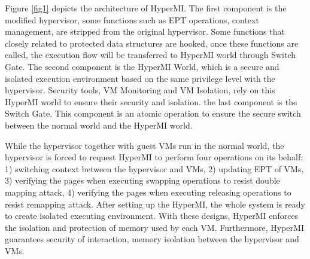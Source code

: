 \documentclass[conference]{IEEEtran}
\begin{document}
Figure \ref{fig1} depicts the architecture of HyperMI. The first component is the modified hypervisor, some functions such as EPT operations, context management, are stripped from the original hypervisor. Some functions that closely related to protected data structures are hooked, once these functions are called, the execution flow will be transferred to HyperMI world through Switch Gate. The second component is the HyperMI World, which is a secure and isolated execution environment based on the same privilege level with the hypervisor. Security tools, VM Monitoring and VM Isolation, rely on this HyperMI world to ensure their security and isolation. the last component is the Switch Gate. This component is an atomic operation to ensure the secure switch between the normal world and the HyperMI world. 




While the hypervisor together with guest VMs run in the normal world, the hypervisor is forced to request HyperMI to perform four operations on its behalf: 1) switching context between the hypervisor and VMs, 2) updating EPT of VMs, 3) verifying the pages when executing swapping operations to resist double mapping attack, 4) verifying the pages when executing releasing operations to resist remapping attack. After setting up the HyperMI, the whole system is ready to create isolated executing environment. With these designs, HyperMI enforces the isolation and protection of memory used by each VM. Furthermore, HyperMI guarantees security of interaction, memory isolation between the hypervisor and VMs.
\end{document}
